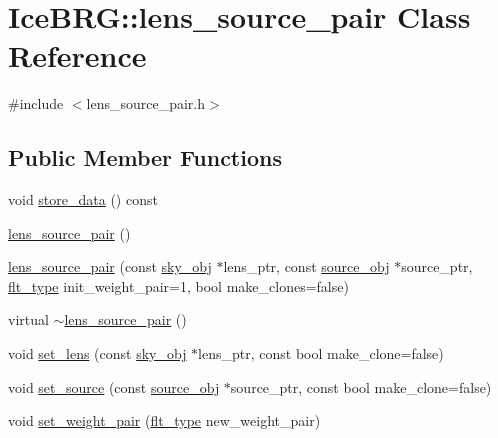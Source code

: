 \hypertarget{classIceBRG_1_1lens__source__pair}{}\section{Ice\+B\+R\+G\+:\+:lens\+\_\+source\+\_\+pair Class Reference}
\label{classIceBRG_1_1lens__source__pair}


{\ttfamily \#include $<$lens\+\_\+source\+\_\+pair.\+h$>$}

\subsection*{Public Member Functions}
\begin{DoxyCompactItemize}
\item 
void \hyperlink{classIceBRG_1_1lens__source__pair_a922a24e5425d386cc94a00675723c34a}{store\+\_\+data} () const 
\item 
\hyperlink{classIceBRG_1_1lens__source__pair_ac645e063e02854ed96f79b53cccbb05e}{lens\+\_\+source\+\_\+pair} ()
\item 
\hyperlink{classIceBRG_1_1lens__source__pair_a495d0ad78258ad99e1a1606fcd2e862c}{lens\+\_\+source\+\_\+pair} (const \hyperlink{classIceBRG_1_1sky__obj}{sky\+\_\+obj} $\ast$lens\+\_\+ptr, const \hyperlink{classIceBRG_1_1source__obj}{source\+\_\+obj} $\ast$source\+\_\+ptr, \hyperlink{lib_2IceBRG__main_2common_8h_ad0f130a56eeb944d9ef2692ee881ecc4}{flt\+\_\+type} init\+\_\+weight\+\_\+pair=1, bool make\+\_\+clones=false)
\item 
virtual \hyperlink{classIceBRG_1_1lens__source__pair_a28127d9807cb756d7623662d9c2597a7}{$\sim$lens\+\_\+source\+\_\+pair} ()
\item 
void \hyperlink{classIceBRG_1_1lens__source__pair_ab4e86eb02371c806ca4692586e5a3316}{set\+\_\+lens} (const \hyperlink{classIceBRG_1_1sky__obj}{sky\+\_\+obj} $\ast$lens\+\_\+ptr, const bool make\+\_\+clone=false)
\item 
void \hyperlink{classIceBRG_1_1lens__source__pair_a1529e7fe0d45ac750fb0e1025ddd1c82}{set\+\_\+source} (const \hyperlink{classIceBRG_1_1source__obj}{source\+\_\+obj} $\ast$source\+\_\+ptr, const bool make\+\_\+clone=false)
\item 
void \hyperlink{classIceBRG_1_1lens__source__pair_af948d45a92d4142d6f6fb47c04af69fc}{set\+\_\+weight\+\_\+pair} (\hyperlink{lib_2IceBRG__main_2common_8h_ad0f130a56eeb944d9ef2692ee881ecc4}{flt\+\_\+type} new\+\_\+weight\+\_\+pair)
\item 

\end{DoxyCompactItemize}
